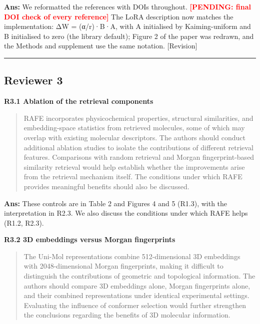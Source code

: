 \documentclass[
  10pt,
]{article}
\newcommand{\placeholder}[1]{\textcolor{red}{\textbf{[PENDING#1]}}}
\begin{document}
\textbf{Ans:} We reformatted the references with DOIs throughout.
\placeholder{: final DOI check of every reference} The LoRA
description now matches the implementation: ΔW = (α/r)·B·A, with A
initialised by Kaiming-uniform and B initialised to zero (the library
default); Figure 2 of the paper was redrawn, and the Methods and
supplement use the same notation. {[}Revision{]}

\begin{center}\rule{0.5\linewidth}{0.5pt}\end{center}

\hypertarget{reviewer-3}{%
\subsection{Reviewer 3}\label{reviewer-3}}

\textbf{R3.1 Ablation of the retrieval components}

\begin{quote}
RAFE incorporates physicochemical properties, structural similarities,
and embedding-space statistics from retrieved molecules, some of which
may overlap with existing molecular descriptors. The authors should
conduct additional ablation studies to isolate the contributions of
different retrieval features. Comparisons with random retrieval and
Morgan fingerprint-based similarity retrieval would help establish
whether the improvements arise from the retrieval mechanism itself. The
conditions under which RAFE provides meaningful benefits should also be
discussed.
\end{quote}

\textbf{Ans:} These controls are in Table 2 and Figures 4 and 5 (R1.3),
with the interpretation in R2.3. We also discuss the conditions under
which RAFE helps (R1.2, R2.3).

\textbf{R3.2 3D embeddings versus Morgan fingerprints}

\begin{quote}
The Uni-Mol representations combine 512-dimensional 3D embeddings with
2048-dimensional Morgan fingerprints, making it difficult to distinguish
the contributions of geometric and topological information. The authors
should compare 3D embeddings alone, Morgan fingerprints alone, and their
combined representations under identical experimental settings.
Evaluating the influence of conformer selection would further strengthen
the conclusions regarding the benefits of 3D molecular information.
\end{quote}
\end{document}
